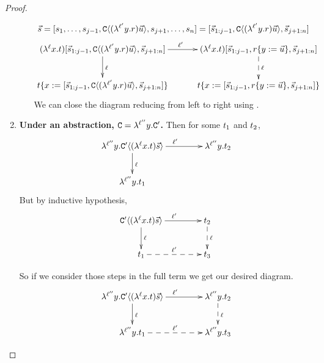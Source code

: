 \begin{proof}
\begin{enumerate}
\begin{enumerate}
    \[ \vec{s} = [s_1, \hdots, s_{j-1},
                      \mathtt{C}\langle(\lambda^{\ell'} y. r) \vec{u}\rangle,
                      s_{j+1}, \hdots, s_n]
                   = [\vec{s}_{1:j-1},
                      \mathtt{C}\langle(\lambda^{\ell'} y. r) \vec{u}\rangle,
                      \vec{s}_{j+1:n}]
    \]
    \[
    \xymatrix@C=1cm{
     (\lamp{\lab}{\var}{\tm}) [\ls{\tmtwo}_{1:j-1},
                               \conof{(\lamp{\lab'}{\vartwo}{\tmfour}) \ls{\tmthree}},
                               \ls{\tmtwo}_{j+1:n}]
                        \ar[d]^{\lab}
                        \ar[r]^{\lab'} &
     (\lamp{\lab}{\var}{\tm}) [\ls{\tmtwo}_{1:j-1},
                               \subs{\tmfour}{\vartwo}{\ls{\tmthree}},
                               \ls{\tmtwo}_{j+1:n}]
                        \ar@{-->}[d]^{\lab} \\
     \subs{\tm}{\var}{[\ls{\tmtwo}_{1:j-1},
                       \conof{(\lamp{\lab'}{\vartwo}{\tmfour}) \ls{\tmthree}},
                       \ls{\tmtwo}_{j+1:n}]}
                       &
      \subs{\tm}{\var}{[\ls{\tmtwo}_{1:j-1},
                        \subs{\tmfour}{\vartwo}{\ls{\tmthree}},\ls{\tmtwo}_{j+1:n}]}        \\
    }
    \]
    We can close the diagram reducing from left to right using .
  \end{enumerate}
\item {\bf Under an abstraction, $\mathtt{C} = \lambda^{\ell''} y. \mathtt{C}'$.}
    Then for some $t_1$ and $t_2$,
    \[
    \xymatrix@C=1.5cm{
        \lamp{\lab''}{\vartwo}{\contwoof{(\lamp{\lab}{\var}{\tm}) \ls{\tmtwo}}}
                        \ar[d]^{\lab}
                        \ar[r]^{\lab'} &
        \lamp{\lab''}{\vartwo}{\tm_2} \\
        \lamp{\lab''}{\vartwo}{\tm_1} & \\
    }
    \]
    But by inductive hypothesis,
    \[
    \xymatrix@C=1.5cm{
        \contwoof{(\lamp{\lab}{\var}{\tm}) \ls{\tmtwo}}
                        \ar[d]^{\lab}
                        \ar[r]^{\lab'} &
        {\tm_2} \ar@{-->}[d]^{\lab} \\ 
        {\tm_1} \ar@{-->}[r]^{\lab'} &
        {\tm_3} \\
    }
    \]

    So if we consider those steps in the full term we get our desired diagram.
    \[
    \xymatrix@C=1.5cm{
        \lamp{\lab''}{\vartwo}{\contwoof{(\lamp{\lab}{\var}{\tm}) \ls{\tmtwo}}}
                        \ar[d]^{\lab}
                        \ar[r]^{\lab'} &
        \lamp{\lab''}{\vartwo}{\tm_2} \ar@{-->}[d]^{\lab} \\ 
        \lamp{\lab''}{\vartwo}{\tm_1} \ar@{-->}[r]^{\lab'} &
        \lamp{\lab''}{\vartwo}{\tm_3} \\
    }
    \]


\end{enumerate}
\end{proof}
